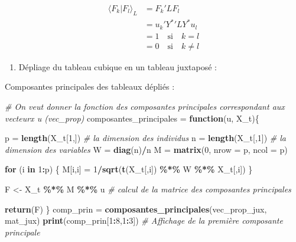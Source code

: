 \documentclass[
]{article}
\newenvironment{Shaded}{\begin{snugshade}}{\end{snugshade}}
\newcommand{\AttributeTok}[1]{\textcolor[rgb]{0.13,0.29,0.53}{#1}}
\newcommand{\CommentTok}[1]{\textcolor[rgb]{0.56,0.35,0.01}{\textit{#1}}}
\newcommand{\ControlFlowTok}[1]{\textcolor[rgb]{0.13,0.29,0.53}{\textbf{#1}}}
\newcommand{\DecValTok}[1]{\textcolor[rgb]{0.00,0.00,0.81}{#1}}
\newcommand{\FunctionTok}[1]{\textcolor[rgb]{0.13,0.29,0.53}{\textbf{#1}}}
\newcommand{\NormalTok}[1]{#1}
\newcommand{\OtherTok}[1]{\textcolor[rgb]{0.56,0.35,0.01}{#1}}
\newcommand{\SpecialCharTok}[1]{\textcolor[rgb]{0.81,0.36,0.00}{\textbf{#1}}}
\providecommand{\tightlist}{%
  \setlength{\itemsep}{0pt}\setlength{\parskip}{0pt}}
\begin{document}
\begin{align*}
\langle F_k | F_l \rangle_L &= F_k' L F_l \\
&= u_k' {Y^*}' L Y^* u_l\\
&= 1 \quad \text{si} \quad k = l\\
&= 0 \quad \text{si} \quad k \neq l 
\end{align*}

\begin{enumerate}
\def\labelenumi{\alph{enumi})}
\setcounter{enumi}{2}
\tightlist
\item
  Dépliage du tableau cubique en un tableau juxtaposé :
\end{enumerate}

Composantes principales des tableaux dépliés :

\begin{Shaded}
\begin{Highlighting}[]
\CommentTok{\# On veut donner la fonction des composantes principales correspondant aux vecteurx u (vec\_prop)}
\NormalTok{composantes\_principales }\OtherTok{=} \ControlFlowTok{function}\NormalTok{(u, X\_t)\{}
  
\NormalTok{  p }\OtherTok{=} \FunctionTok{length}\NormalTok{(X\_t[}\DecValTok{1}\NormalTok{,]) }\CommentTok{\# la dimension des individus}
\NormalTok{  n }\OtherTok{=} \FunctionTok{length}\NormalTok{(X\_t[,}\DecValTok{1}\NormalTok{]) }\CommentTok{\# la dimension des variables}
\NormalTok{  W }\OtherTok{=} \FunctionTok{diag}\NormalTok{(n)}\SpecialCharTok{/}\NormalTok{n}
\NormalTok{  M }\OtherTok{=} \FunctionTok{matrix}\NormalTok{(}\DecValTok{0}\NormalTok{, }\AttributeTok{nrow =}\NormalTok{ p, }\AttributeTok{ncol =}\NormalTok{ p)}
  
  \ControlFlowTok{for}\NormalTok{ (i }\ControlFlowTok{in} \DecValTok{1}\SpecialCharTok{:}\NormalTok{p) \{}
\NormalTok{    M[i,i] }\OtherTok{=} \DecValTok{1}\SpecialCharTok{/}\FunctionTok{sqrt}\NormalTok{(}\FunctionTok{t}\NormalTok{(X\_t[,i]) }\SpecialCharTok{\%*\%}\NormalTok{ W }\SpecialCharTok{\%*\%}\NormalTok{ X\_t[,i])}
\NormalTok{  \}}
  
\NormalTok{  F }\OtherTok{\textless{}{-}}\NormalTok{ X\_t }\SpecialCharTok{\%*\%}\NormalTok{ M }\SpecialCharTok{\%*\%}\NormalTok{ u }\CommentTok{\# calcul de la matrice des composantes principales}
  
  \FunctionTok{return}\NormalTok{(F)}
\NormalTok{\}}
\NormalTok{comp\_prin }\OtherTok{=} \FunctionTok{composantes\_principales}\NormalTok{(vec\_prop\_jux, mat\_jux)}
\FunctionTok{print}\NormalTok{(comp\_prin[}\DecValTok{1}\SpecialCharTok{:}\DecValTok{8}\NormalTok{,}\DecValTok{1}\SpecialCharTok{:}\DecValTok{3}\NormalTok{]) }\CommentTok{\# Affichage de la première composante principale}
\end{Highlighting}
\end{Shaded}
\end{document}
